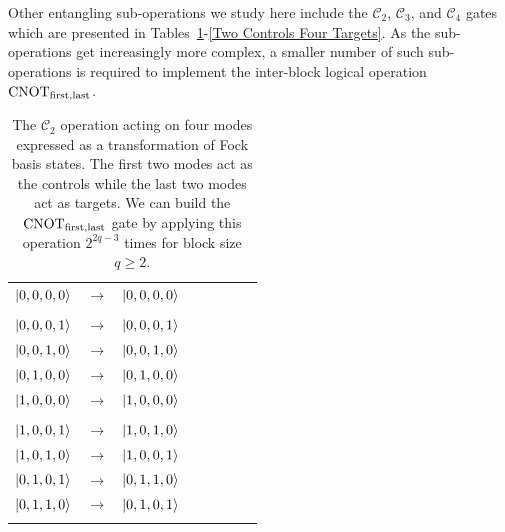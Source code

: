 \documentclass[aps,pra,twocolumn,superscriptaddress,floatfix,10pt]{revtex4}
\begin{document}
Other entangling sub-operations we study here include the $\mathcal{C}_2$, $\mathcal{C}_3$, and $\mathcal{C}_4$ gates which are presented in Tables~\ref{Two Controls Two Targets}-\ref{Two Controls Four Targets}. As the sub-operations get increasingly more complex, a smaller number of such sub-operations is required to implement the inter-block logical operation  $\mbox{CNOT}_{\rm first,last}$.
\begin {table}[h]
\begin{center}
	\begin{tabular}{l*{6}{c}r} 
		$\ket{0,0,0,0}$  &  $\rightarrow$ & $\ket{0,0,0,0}$ \\ \\
		$\ket{0,0,0,1}$  & $\rightarrow$ & $\ket{0,0,0,1}$ \\
		$\ket{0,0,1,0}$ & $\rightarrow$ & $\ket{0,0,1,0}$ \\
		$\ket{0,1,0,0}$ & $\rightarrow$ & $\ket{0,1,0,0} $ \\ 
		$\ket{1,0,0,0}$ & $\rightarrow$ & $\ket{1,0,0,0} $ \\ \\
		$\ket{1,0,0,1}$  & $\rightarrow$ & $\ket{1,0,1,0}$ \\
		$\ket{1,0,1,0}$ & $\rightarrow$ & $\ket{1,0,0,1}$ \\
		$\ket{0,1,0,1}$ & $\rightarrow$ & $\ket{0,1,1,0} $ \\ 
		$\ket{0,1,1,0}$ & $\rightarrow$ & $\ket{0,1,0,1} $ \\ \\
	\end{tabular}
	\caption{ \label{Two Controls Two Targets} The $\mathcal{C}_2$  operation acting on four modes expressed as a transformation of Fock basis states. The first two modes act as the controls while the last two modes act as targets. We can build the $\mbox{CNOT}_{\rm first,last}$ gate by applying this operation $2^{2 q - 3}$ times for block size $ q \ge 2 $.}
\end{center}
\end{table}
\end{document}
